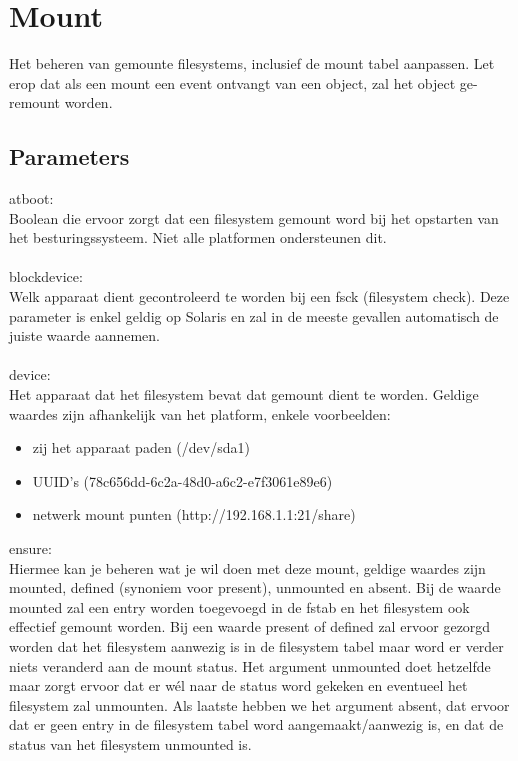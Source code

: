 \section{Mount}

Het beheren van gemounte filesystems, inclusief de mount tabel aanpassen. Let erop dat als een mount een event ontvangt van een object, zal het object ge-remount worden.

\subsection{Parameters}

atboot:\\
Boolean die ervoor zorgt dat een filesystem gemount word bij het opstarten van het besturingssysteem. Niet alle platformen ondersteunen dit.\\\\
%
blockdevice:\\
Welk apparaat dient gecontroleerd te worden bij een fsck (filesystem check). Deze parameter is enkel geldig op Solaris en zal in de meeste gevallen automatisch de juiste waarde aannemen.\\\\
%
device:\\
Het apparaat dat het filesystem bevat dat gemount dient te worden. Geldige waardes zijn afhankelijk van het platform, enkele voorbeelden:
\begin{itemize}
\item zij het apparaat paden (/dev/sda1)
\item UUID's (78c656dd-6c2a-48d0-a6c2-e7f3061e89e6)
\item netwerk mount punten (http://192.168.1.1:21/share)
\end{itemize}
%
ensure:\\
Hiermee kan je beheren wat je wil doen met deze mount, geldige waardes zijn mounted, defined (synoniem voor present), unmounted en absent. Bij de waarde mounted zal een entry worden toegevoegd in de fstab en het filesystem ook effectief gemount worden. Bij een waarde present of defined zal ervoor gezorgd worden dat het filesystem aanwezig is in de filesystem tabel maar word er verder niets veranderd aan de mount status. Het argument unmounted doet hetzelfde maar zorgt ervoor dat er w\'el naar de status word gekeken en eventueel het filesystem zal unmounten. Als laatste hebben we het argument absent, dat ervoor dat er geen entry in de filesystem tabel word aangemaakt/aanwezig is, en dat de status van het filesystem unmounted is.\\\\
